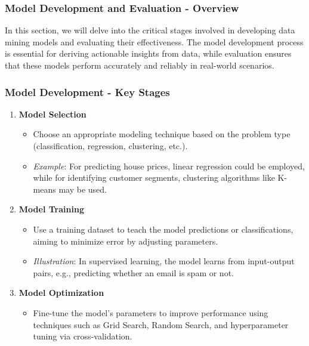 \documentclass{beamer}
\begin{document}
\begin{frame}
    \frametitle{Model Development and Evaluation - Overview}
    In this section, we will delve into the critical stages involved in developing data mining models and evaluating their effectiveness. 
    The model development process is essential for deriving actionable insights from data, while evaluation ensures that these models perform accurately and reliably in real-world scenarios.
\end{frame}

\begin{frame}[fragile]
    \frametitle{Model Development - Key Stages}
    \begin{enumerate}
        \item \textbf{Model Selection}
            \begin{itemize}
                \item Choose an appropriate modeling technique based on the problem type (classification, regression, clustering, etc.).
                \item \textit{Example}: For predicting house prices, linear regression could be employed, while for identifying customer segments, clustering algorithms like K-means may be used.
            \end{itemize}

        \item \textbf{Model Training}
            \begin{itemize}
                \item Use a training dataset to teach the model predictions or classifications, aiming to minimize error by adjusting parameters.
                \item \textit{Illustration}: In supervised learning, the model learns from input-output pairs, e.g., predicting whether an email is spam or not.
            \end{itemize}

        \item \textbf{Model Optimization}
            \begin{itemize}
                \item Fine-tune the model’s parameters to improve performance using techniques such as Grid Search, Random Search, and hyperparameter tuning via cross-validation.
            \end{itemize}
    \end{enumerate}
\end{frame}
\end{document}
